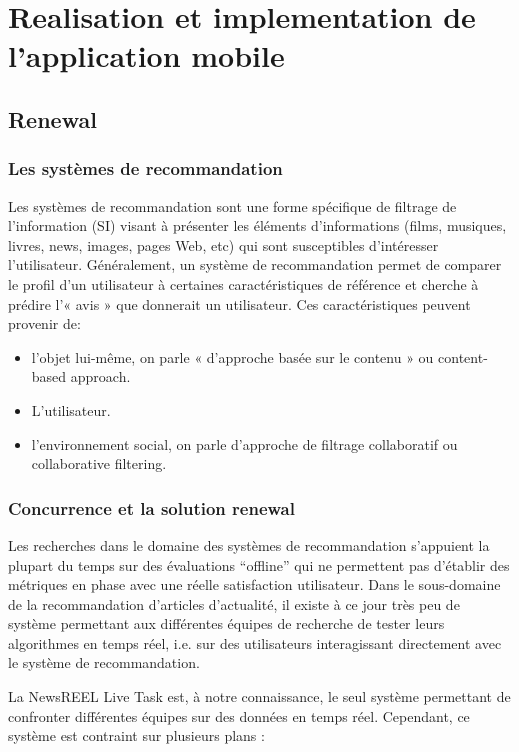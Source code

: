 \chapter{Realisation et implementation de l'application mobile}
\label{sec:Realisation de l'application mobile}

\section{Renewal}

\subsection{Les systèmes de recommandation}
Les systèmes de recommandation sont une forme spécifique de filtrage de l'information (SI) visant à présenter les éléments d'informations (films, musiques, livres, news, images, pages Web, etc) qui sont susceptibles d'intéresser l'utilisateur. Généralement, un système de recommandation permet de comparer le profil d'un utilisateur à certaines caractéristiques de référence et cherche à prédire l'« avis » que donnerait un utilisateur. Ces caractéristiques peuvent provenir de:

\begin{itemize}
    \item l'objet lui-même, on parle « d'approche basée sur le contenu » ou content-based approach. 
     \item L'utilisateur. 
    \item  l'environnement social, on parle d'approche de filtrage collaboratif ou collaborative filtering.

\end{itemize}

\subsection{Concurrence et la solution renewal}
Les recherches dans le domaine des systèmes de recommandation s’appuient la plupart du temps sur des évaluations “offline” qui ne permettent pas d’établir des métriques en phase avec une réelle satisfaction utilisateur. Dans le sous-domaine de la recommandation d’articles d’actualité, il existe à ce jour très peu de système permettant aux différentes équipes de recherche de tester leurs algorithmes en temps réel, i.e. sur des utilisateurs interagissant directement avec le système de recommandation.


La NewsREEL Live Task \cite{clef-newsreel} est, à notre connaissance, le seul système permettant de confronter différentes équipes sur des données en temps réel. Cependant, ce système est contraint sur plusieurs plans :

